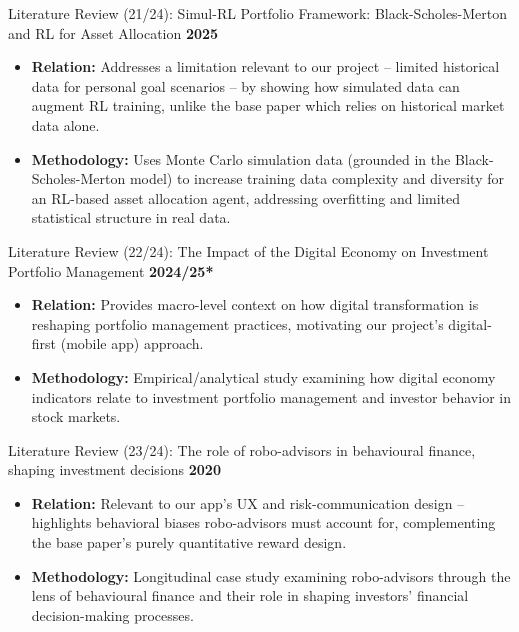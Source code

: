 \documentclass{beamer}
\begin{document}
\begin{frame}{Literature Review (21/24): Simul-RL Portfolio Framework: Black-Scholes-Merton and RL for Asset Allocation}
\small
\textbf{2025}
\begin{itemize}
    \item \textbf{Relation:} Addresses a limitation relevant to our project -- limited historical data for personal goal scenarios -- by showing how simulated data can augment RL training, unlike the base paper which relies on historical market data alone.
    \item \textbf{Methodology:} Uses Monte Carlo simulation data (grounded in the Black-Scholes-Merton model) to increase training data complexity and diversity for an RL-based asset allocation agent, addressing overfitting and limited statistical structure in real data.
\end{itemize}
\end{frame}

\begin{frame}{Literature Review (22/24): The Impact of the Digital Economy on Investment Portfolio Management}
\small
\textbf{2024/25*}
\begin{itemize}
    \item \textbf{Relation:} Provides macro-level context on how digital transformation is reshaping portfolio management practices, motivating our project's digital-first (mobile app) approach.
    \item \textbf{Methodology:} Empirical/analytical study examining how digital economy indicators relate to investment portfolio management and investor behavior in stock markets.
\end{itemize}
\end{frame}

\begin{frame}{Literature Review (23/24): The role of robo-advisors in behavioural finance, shaping investment decisions}
\small
\textbf{2020}
\begin{itemize}
    \item \textbf{Relation:} Relevant to our app's UX and risk-communication design -- highlights behavioral biases robo-advisors must account for, complementing the base paper's purely quantitative reward design.
    \item \textbf{Methodology:} Longitudinal case study examining robo-advisors through the lens of behavioural finance and their role in shaping investors' financial decision-making processes.
\end{itemize}
\end{frame}
\end{document}
